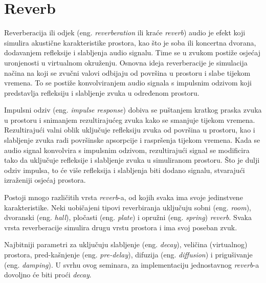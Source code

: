 \documentclass[times, utf8, seminar, numeric]{fer}
\begin{document}
\section{Reverb}

Reverberacija ili odjek (eng. \textit{reverberation} ili kraće \textit{reverb}) audio je efekt koji simulira akustične karakteristike prostora, kao što je soba ili koncertna dvorana, dodavanjem refleksije i slabljenja audio signalu. Time se u zvukom postiže osjećaj uronjenosti u virtualnom okruženju. Osnovna ideja reverberacije je simulacija načina na koji se zvučni valovi odbijaju od površina u prostoru i slabe tijekom vremena. To se postiže konvolviranjem audio signala s impulsnim odzivom koji predstavlja refleksiju i slabljenje zvuka u određenom prostoru.\cite{lloyd1937music}

Impulsni odziv (eng. \textit{impulse response}) dobiva se puštanjem kratkog praska zvuka u prostoru i snimanjem rezultirajućeg zvuka kako se smanjuje tijekom vremena. Rezultirajući valni oblik uključuje refleksiju zvuka od površina u prostoru, kao i slabljenje zvuka radi površinske apsorpcije i raspršenja tijekom vremena. Kada se audio signal konvolvira s impulsnim odzivom, rezultirajući signal se modificira tako da uključuje refleksije i slabljenje zvuka u simuliranom prostoru. Što je dulji odziv impulsa, to će više refleksija i slabljenja biti dodano signalu, stvarajući izraženiji osjećaj prostora.\cite{gardner2002reverberation}

Postoji mnogo različitih vrsta \textit{reverb}-a, od kojih svaka ima svoje jedinstvene karakteristike. Neki uobičajeni tipovi reverbiranja uključuju sobni (eng. \textit{room}), dvoranski (eng. \textit{hall}), pločasti (eng. \textit{plate}) i opružni (eng. \textit{spring}) \textit{reverb}. Svaka vrsta reverberacije simulira drugu vrstu prostora i ima svoj poseban zvuk.

Najbitniji parametri za  uključuju slabljenje (eng. \textit{decay}), veličina (virtualnog) prostora, pred-kašnjenje (eng. \textit{pre-delay}), difuzija (eng. \textit{diffusion}) i prigušivanje (eng. \textit{damping}).\cite{nativeinstrumentsReverbEssential} U svrhu ovog seminara, za implementaciju jednostavnog \textit{reverb}-a dovoljno će biti proći \textit{decay}.
\end{document}

